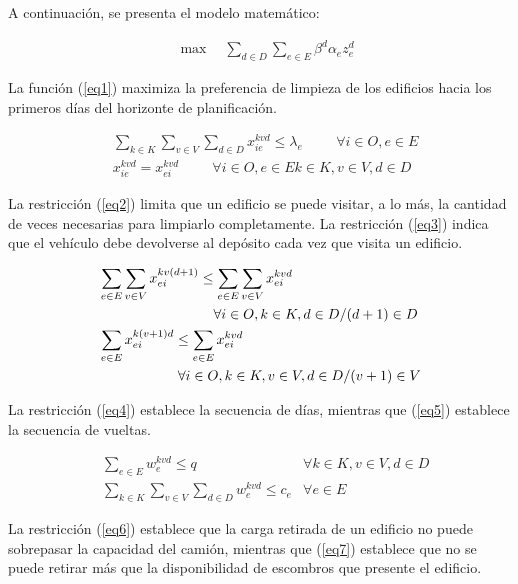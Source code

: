 \documentclass[letterpaper,conference]{IEEEtran}
\begin{document}
A continuación, se presenta el modelo matemático:

{\small
\begin{align}
	& \max \quad \sum_{d \in D} \sum_{e \in E} \beta^{d}  \alpha_e z_e^d  \label{eq1}
\end{align}
}

La función (\ref{eq1}) maximiza la preferencia de limpieza de los edificios hacia los primeros días del horizonte de planificación.

{\small
\begin{align}
	& \sum_{k \in K} \sum_{v \in V} \sum_{d \in D} x_{ie}^{kvd} \leq \lambda_e \hspace{1cm} \forall i \in O , e \in E \label{eq2} \\
	& x_{ie}^{kvd} = x_{ei}^{kvd} \hspace{1cm} \forall i \in O, e \in E k \in K, v \in V, d \in D \label{eq3}
\end{align}
}

La restricción (\ref{eq2}) limita que un edificio se puede visitar, a lo más, la cantidad de veces necesarias para limpiarlo completamente. La restricción (\ref{eq3}) indica que el vehículo debe devolverse al depósito cada vez que visita un edificio.

{\small
\begin{align}
 	& \sum_{e \in E} \sum_{v \in V} x_{ei}^{kv(d+1)} \leq \sum_{e \in E} \sum_{v \in V} x_{ei}^{kvd}   \label{eq4} \\ \nonumber
 	& \hspace{2.9cm} \forall i \in O, k \in K, d \in D / (d+1) \in D   \\
	& \sum_{e \in E} x_{ei}^{k(v+1)d} \leq \sum_{e \in E} x_{ei}^{kvd} \label{eq5} \\ \nonumber
	& \hspace{2cm} \forall i \in O, k \in K, v \in V, d \in D /(v+1) \in V 
\end{align}
}

La restricción (\ref{eq4}) establece la secuencia de días, mientras que (\ref{eq5}) establece la secuencia de vueltas.

{\small
\begin{align}
	& \sum_{e \in E} w_{e}^{kvd} \leq q & \forall k \in K, v \in V, d \in D \label{eq6} \\
	& \sum_{k \in K} \sum_{v \in V} \sum_{d \in D} w_{e}^{kvd} \leq c_e & \forall e \in E \label{eq7}
\end{align}
}

La restricción (\ref{eq6}) establece que la carga retirada de un edificio no puede sobrepasar la capacidad del camión, mientras que (\ref{eq7}) establece que no se puede retirar más que la disponibilidad de escombros que presente el edificio.
\end{document}
